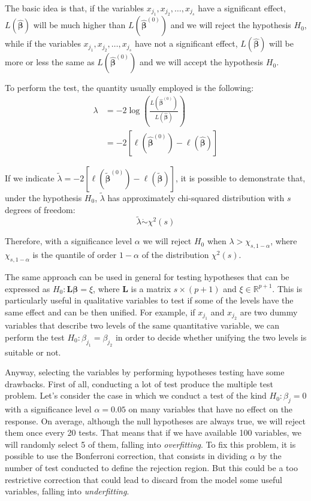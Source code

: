 \documentclass[a4paper, twoside, openright, 12pt]{report}
\theoremstyle{definition}
\theoremstyle{definition}
\theoremstyle{definition}
\theoremstyle{remark}
\begin{document}
The basic idea is that, if the variables \(x_{j_1}, x_{j_2}, \dots, x_{j_s}\) have a significant effect, \(L\left(\hat{\boldsymbol{\beta}}\right)\) will be much higher than \(L\left(\hat{\boldsymbol{\beta}}^{(0)}\right)\) and we will reject the hypothesis \(H_0\), while if the variables \(x_{j_1}, x_{j_2}, \dots, x_{j_s}\) have not a significant effect, \(L\left(\hat{\boldsymbol{\beta}}\right)\) will be more or less the same as \(L\left(\hat{\boldsymbol{\beta}}^{(0)}\right)\) and we will accept the hypothesis \(H_0\).

To perform the test, the quantity usually employed is the following:
\begin{align*}
\lambda & = -2 \log{\left( \frac{L\left(\hat{\boldsymbol{\beta}}^{(0)}\right)}{L\left(\hat{\boldsymbol{\beta}}\right)} \right)} \\
& = -2 \left[ \ell\left(\hat{\boldsymbol{\beta}}^{(0)}\right) - \ell\left(\hat{\boldsymbol{\beta}}\right) \right]
\end{align*}

If we indicate \(\tilde{\lambda} = -2 \left[ \ell\left(\tilde{\boldsymbol{\beta}}^{(0)}\right) - \ell\left(\tilde{\boldsymbol{\beta}}\right) \right]\), it is possible to demonstrate that, under the hypothesis \(H_0\), \(\tilde{\lambda}\) has approximately chi-squared distribution with \(s\) degrees of freedom:
\[
\tilde{\lambda} \dot\sim \chi^2(s)
\]

Therefore, with a significance level \(\alpha\) we will reject \(H_0\) when \(\lambda > \chi_{s, 1-\alpha}\), where \(\chi_{s, 1-\alpha}\) is the quantile of order \(1-\alpha\) of the distribution \(\chi^2(s)\).

The same approach can be used in general for testing hypotheses that can be expressed as \(H_0: \boldsymbol{L}\boldsymbol{\beta} = \xi\), where \(\boldsymbol{L}\) is a matrix \(s\times(p+1)\) and \(\xi\in\mathbb{R}^{p+1}\). This is particularly useful in qualitative variables to test if some of the levels have the same effect and can be then unified. For example, if \(x_{j_1}\) and \(x_{j_2}\) are two dummy variables that describe two levels of the same quantitative variable, we can perform the test \(H_0: \beta_{j_1} = \beta_{j_2}\) in order to decide whether unifying the two levels is suitable or not.

Anyway, selecting the variables by performing hypotheses testing have some drawbacks. First of all, conducting a lot of test produce the multiple test problem. Let's consider the case in which we conduct a test of the kind \(H_0: \beta_j = 0\) with a significance level \(\alpha=0.05\) on many variables that have no effect on the response. On average, although the null hypotheses are always true, we will reject them once every 20 tests. That means that if we have available 100 variables, we will randomly select 5 of them, falling into \emph{overfitting}. To fix this problem, it is possible to use the Bonferroni correction, that consists in dividing \(\alpha\) by the number of test conducted to define the rejection region. But this could be a too restrictive correction that could lead to discard from the model some useful variables, falling into \emph{underfitting}.
\end{document}

